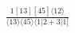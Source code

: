 \documentclass[varwidth, border=5pt]{standalone}
\begin{document}
\begin{my}
$\begin{gathered}
\scriptscriptstyle\frac{1[13][45]⟨12⟩}{⟨13⟩⟨45⟩⟨1|2+3|1]}
\end{gathered}$
\end{my}
\end{document}

